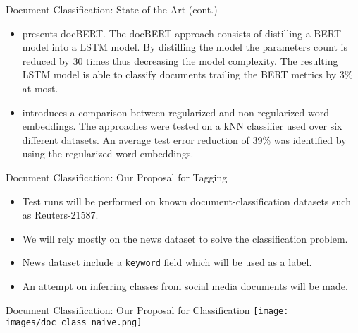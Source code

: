 \documentclass[aspectratio=169]{beamer}
\begin{document}
\begin{frame}{Document Classification: State of the Art (cont.)}
    \begin{itemize}
        \item \cite{DC_DOCBERT} presents docBERT. The docBERT approach consists of distilling a BERT model into a LSTM model. By distilling the model the parameters count is reduced by 30 times thus decreasing the model complexity. The resulting LSTM model is able to classify documents trailing the BERT metrics by 3\% at most.
        \item \cite{DC_REG_EMBEDDING} introduces a comparison between regularized and non-regularized word embeddings. The approaches were tested on a kNN classifier used over six different datasets. An average test error reduction of 39\% was identified by using the regularized word-embeddings.
    \end{itemize}
\end{frame}

\begin{frame}{Document Classification: Our Proposal for Tagging}
    \begin{itemize}
        \item Test runs will be performed on known document-classification datasets such as Reuters-21587.
        \item We will rely mostly on the news dataset to solve the classification problem.
        \item News dataset include a \texttt{keyword} field which will be used as a label.
        \item An attempt on inferring classes from social media documents will be made.
    \end{itemize}
\end{frame}

\begin{frame}{Document Classification: Our Proposal for Classification}
    \centering
    \texttt{[image: images/doc\_class\_naive.png]}
\end{frame}
\end{document}
